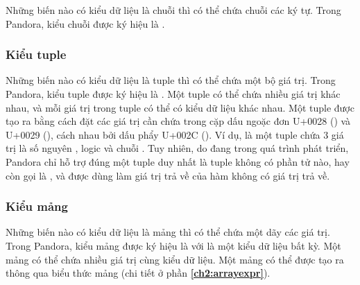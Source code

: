     Những biến nào có kiểu dữ liệu là chuỗi thì có thể chứa chuỗi các ký tự. Trong Pandora, kiểu chuỗi được ký hiệu là .

\subsubsection{Kiểu tuple}

Những biến nào có kiểu dữ liệu là tuple thì có thể chứa một bộ giá trị. Trong Pandora, kiểu tuple được ký hiệu là . Một tuple có thể chứa nhiều giá trị khác nhau, và mỗi giá trị trong tuple có thể có kiểu dữ liệu khác nhau. Một tuple được tạo ra bằng cách đặt các giá trị cần chứa trong cặp dấu ngoặc đơn U+0028 (\kw{(}) và U+0029 (\kw{)}), cách nhau bởi dấu phẩy U+002C (\kw{,}). Ví dụ,  là một tuple chứa 3 giá trị là số nguyên , logic  và chuỗi . Tuy nhiên, do đang trong quá trình phát triển, Pandora chỉ hỗ trợ đúng một tuple duy nhất là tuple không có phần tử nào, hay còn gọi là , và được dùng làm giá trị trả về của hàm không có giá trị trả về.

\subsubsection{Kiểu mảng}

Những biến nào có kiểu dữ liệu là mảng thì có thể chứa một dãy các giá trị. Trong Pandora, kiểu mảng được ký hiệu là \kw{[T]} với  là một kiểu dữ liệu bất kỳ. Một mảng có thể chứa nhiều giá trị cùng kiểu dữ liệu. Một mảng có thể được tạo ra thông qua biểu thức mảng (chi tiết ở phần \textbf{\ref{ch2:arrayexpr}}).
